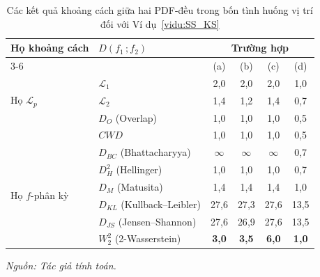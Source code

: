 \documentclass[a4paper,oneside]{book} %
\theoremstyle{plain}
\theoremstyle{plain}
\theoremstyle{nonumberplain}
\begin{document}
{\begin{table}[H]
	\caption{Các kết quả khoảng cách giữa hai PDF-đều trong bốn tình huống vị trí đối với Ví dụ~\ref{vidu:SS_KS}}
	\label{tab:vidusosanh}
	\centering\footnotesize
	\begin{tabular*}{\columnwidth}{@{\extracolsep\fill}llcccc@{\extracolsep\fill}}
		\toprule
		\multirow{2}{*}{Họ khoảng cách}     & \multirow{2}{*}{$D(f_1\,;f_2)$} &          \multicolumn{4}{c}{Trường hợp}          \\ \cmidrule{3-6}
		                                    &                                 &    (a)     &    (b)    &    (c)     &    (d)     \\ \midrule
		\multirow{3}{*}{Họ $\mathcal{L}_p$} & $\mathcal{L}_1$                 &   2{,}0   &  2{,}0   &   2{,}0   &   1{,}0   \\
		                                    & $\mathcal{L}_2$                 &   1{,}4   &  1{,}2   &   1{,}4   &   0{,}7   \\
		                                    & $D_O$ (Overlap)                 &   1{,}0   &  1{,}0   &   1{,}0   &   0{,}5   \\
		                                    & $CWD$                           &   1{,}0   &  1{,}0   &   1{,}0   &   0{,}5   \\ \midrule
		\multirow{6}{*}{Họ  $f$-phân kỳ}    & $D_{BC}$ (Bhattacharyya)        &  $\infty$  & $\infty$  &  $\infty$  &   0{,}7   \\
		                                    & $D^2_H$ (Hellinger)             &   1{,}0   &  1{,}0   &   1{,}0   &   0{,}7   \\
		                                    & $D_M$ (Matusita)                &   1{,}4   &  1{,}4   &   1{,}4   &   1{,}0   \\
		                                    & $D_{KL}$ (Kullback–Leibler)     &  27{,}6   &  27{,}3  &  27{,}6   &  13{,}5   \\
		                                    & $D_{JS}$ (Jensen–Shannon)       &  27{,}6   &  26{,}9  &  27{,}6   &  13{,}5   \\ \midrule
		Họ Optimal                          & $W_2^2$ (2-Wasserstein)         & \bf 3{,}0 & \bf 3{,}5 & \bf 6{,}0 & \bf 1{,}0 \\ \bottomrule
	\end{tabular*}
	\begin{minipage}{\textwidth}
		\fontsize{11pt}{14pt}\selectfont\it
		Nguồn: Tác giả tính toán.
	\end{minipage}
\end{table}

}
\end{document}
